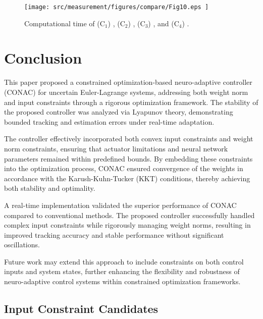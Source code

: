 \documentclass[lettersize,journal]{IEEEtran}
\begin{document}
\begin{figure}[t]
    \centering
        \texttt{[image: 
            src/measurement/figures/compare/Fig10.eps
        ]}%
    \caption{
        Computational time of (C$_1$) \protect{}, (C$_2$) \protect{}, (C$_3$) \protect{}, and (C$_4$) \protect{}.
    }
    \label{fig:ctrl:real:result:cmp:time}
  \end{figure}

\section{Conclusion}\label{sec:conclusion}

This paper proposed a constrained optimization-based neuro-adaptive controller (CONAC) for uncertain Euler-Lagrange systems, addressing both weight norm and input constraints through a rigorous optimization framework. 
The stability of the proposed controller was analyzed via Lyapunov theory, demonstrating bounded tracking and estimation errors under real-time adaptation.

The controller effectively incorporated both convex input constraints and weight norm constraints, ensuring that actuator limitations and neural network parameters remained within predefined bounds. 
By embedding these constraints into the optimization process, CONAC ensured convergence of the weights in accordance with the Karush-Kuhn-Tucker (KKT) conditions, thereby achieving both stability and optimality.

A real-time implementation validated the superior performance of CONAC compared to conventional methods. 
The proposed controller successfully handled complex input constraints while rigorously managing weight norms, resulting in improved tracking accuracy and stable performance without significant oscillations.

Future work may extend this approach to include constraints on both control inputs and system states, further enhancing the flexibility and robustness of neuro-adaptive control systems within constrained optimization frameworks.

\appendix

\subsection{Input Constraint Candidates}\label{sec:appen:cstr} 
\end{document}
